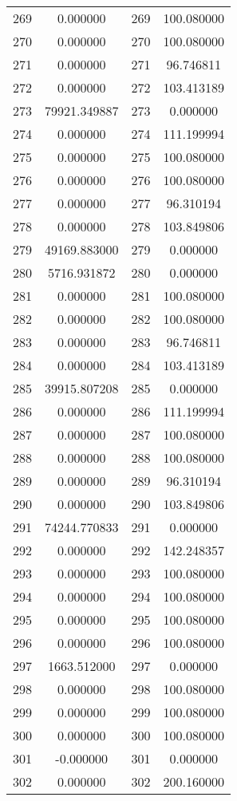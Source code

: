 \documentclass[12pt]{article}
\begin{document}
\begin{longtable}{@{}cccc@{}}
269 & 0.000000 & 269 & 100.080000 \\
270 & 0.000000 & 270 & 100.080000 \\
271 & 0.000000 & 271 & 96.746811 \\
272 & 0.000000 & 272 & 103.413189 \\
273 & 79921.349887 & 273 & 0.000000 \\
274 & 0.000000 & 274 & 111.199994 \\
275 & 0.000000 & 275 & 100.080000 \\
276 & 0.000000 & 276 & 100.080000 \\
277 & 0.000000 & 277 & 96.310194 \\
278 & 0.000000 & 278 & 103.849806 \\
279 & 49169.883000 & 279 & 0.000000 \\
280 & 5716.931872 & 280 & 0.000000 \\
281 & 0.000000 & 281 & 100.080000 \\
282 & 0.000000 & 282 & 100.080000 \\
283 & 0.000000 & 283 & 96.746811 \\
284 & 0.000000 & 284 & 103.413189 \\
285 & 39915.807208 & 285 & 0.000000 \\
286 & 0.000000 & 286 & 111.199994 \\
287 & 0.000000 & 287 & 100.080000 \\
288 & 0.000000 & 288 & 100.080000 \\
289 & 0.000000 & 289 & 96.310194 \\
290 & 0.000000 & 290 & 103.849806 \\
291 & 74244.770833 & 291 & 0.000000 \\
292 & 0.000000 & 292 & 142.248357 \\
293 & 0.000000 & 293 & 100.080000 \\
294 & 0.000000 & 294 & 100.080000 \\
295 & 0.000000 & 295 & 100.080000 \\
296 & 0.000000 & 296 & 100.080000 \\
297 & 1663.512000 & 297 & 0.000000 \\
298 & 0.000000 & 298 & 100.080000 \\
299 & 0.000000 & 299 & 100.080000 \\
300 & 0.000000 & 300 & 100.080000 \\
301 & -0.000000 & 301 & 0.000000 \\
302 & 0.000000 & 302 & 200.160000 \\

\end{longtable}
\end{document}

